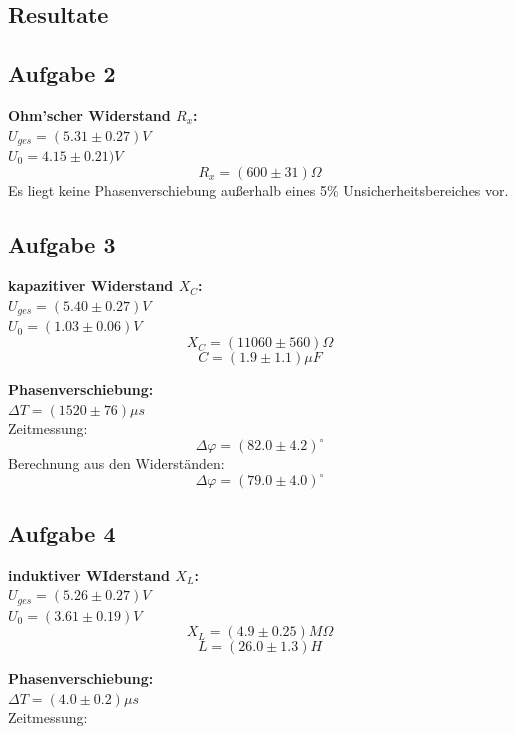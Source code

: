 \documentclass[12pt,a4paper]{article}
\begin{document}
\begin{multicols}{2}
\section{Resultate}

\subsection{Aufgabe 2}
\textbf{Ohm'scher Widerstand $R_x$:}\\
$U_{ges} = (5.31 \pm 0.27)V$\\
$U_0 = 4.15 \pm 0.21)V$\\
$$R_x=(600 \pm 31)\Omega$$
Es liegt keine Phasenverschiebung außerhalb eines 5\% Unsicherheitsbereiches vor.

\subsection{Aufgabe 3}
\textbf{kapazitiver Widerstand $X_C$:}\\
$U_{ges}=(5.40 \pm 0.27)V$\\
$U_0=(1.03\pm 0.06)V$\\
$$X_C=(11060\pm 560)\Omega$$
$$C=(1.9\pm 1.1)\mu F$$

\textbf{Phasenverschiebung:}\\
$\Delta T = (1520\pm 76) \mu s$\\
Zeitmessung:
$$\Delta \varphi = (82.0 \pm 4.2)^\circ$$
Berechnung aus den Widerständen:
$$\Delta \varphi = (79.0 \pm 4.0)^\circ$$

\subsection{Aufgabe 4}
\textbf{induktiver WIderstand $X_L$:}\\
$U_{ges}=(5.26\pm 0.27)V$\\
$U_0=(3.61 \pm 0.19)V$\\
$$X_L=(4.9\pm 0.25)M\Omega$$
$$L=(26.0 \pm 1.3)H$$

\textbf{Phasenverschiebung:}\\
$\Delta T = (4.0\pm 0.2) \mu s$\\
Zeitmessung:



\end{multicols}
\end{document}
